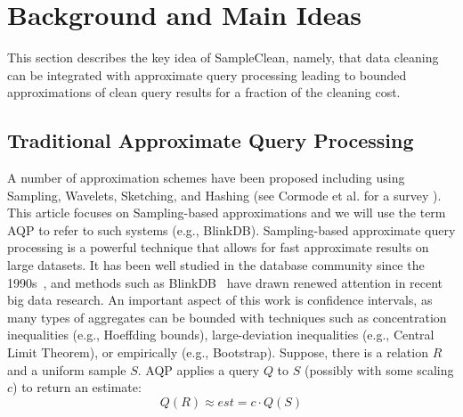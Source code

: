 \section{Background and Main Ideas}

This section describes the key idea of SampleClean, namely, that data cleaning can be integrated with approximate query processing leading to bounded approximations of clean query results for a fraction of the cleaning cost.

\subsection{Traditional Approximate Query Processing}
A number of approximation schemes have been proposed including using Sampling, Wavelets, Sketching, and Hashing (see Cormode et al. for a survey \cite{DBLP:journals/ftdb/CormodeGHJ12}).
This article focuses on Sampling-based approximations and we will use the term AQP to refer to such systems (e.g., BlinkDB\cite{DBLP:conf/eurosys/AgarwalMPMMS13}).
Sampling-based approximate query processing is a powerful technique that allows for fast approximate results on large datasets. 
It has been well studied in the database community since the 1990s~\cite{DBLP:conf/sigmod/HellersteinHW97,DBLP:conf/sigmod/AcharyaGPR99,DBLP:conf/icde/OlkenR92, OlkenR86}, and methods such as BlinkDB~\cite{DBLP:conf/eurosys/AgarwalMPMMS13} have drawn renewed attention in recent big data research. 
An important aspect of this work is confidence intervals, as many types of aggregates can be bounded with techniques such as concentration inequalities (e.g., Hoeffding bounds), large-deviation inequalities (e.g., Central Limit Theorem), or empirically (e.g., Bootstrap). 
Suppose, there is a relation $R$ and a uniform sample $S$.
AQP applies a query $Q$ to $S$ (possibly with some scaling $c$) to return an estimate: 
\[
Q(R) \approx est = c \cdot Q(S)
\]

